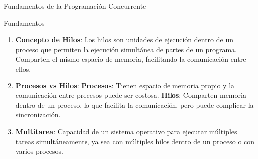 \documentclass{beamer}
\begin{document}
\begin{frame}{Fundamentos de la Programación Concurrente}
  \begin{block}{Fundamentos}
    \begin{enumerate}
         \item \textbf{Concepto de Hilos}:
            Los hilos son unidades de ejecución dentro de un proceso que permiten la ejecución simultánea de partes de un programa. Comparten el mismo espacio de memoria, facilitando la comunicación entre ellos.
        \item \textbf{Procesos vs Hilos}:
            \textbf{Procesos}: Tienen espacio de memoria propio y la comunicación entre procesos puede ser costosa.
            \textbf{Hilos}: Comparten memoria dentro de un proceso, lo que facilita la comunicación, pero puede complicar la sincronización.
        \item \textbf{Multitarea}:
            Capacidad de un sistema operativo para ejecutar múltiples tareas simultáneamente, ya sea con múltiples hilos dentro de un proceso o con varios procesos.
    \end{enumerate}
  \end{block}
  \end{frame}
\end{document}

